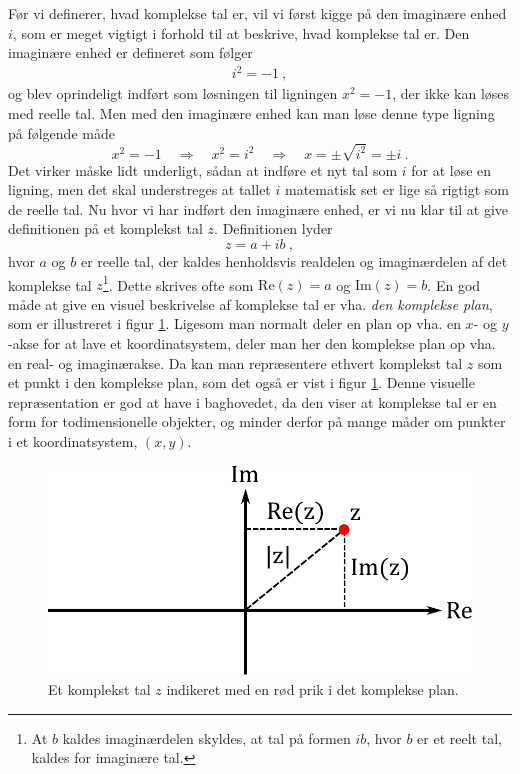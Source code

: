Før vi definerer, hvad komplekse tal er, vil vi først kigge på den imaginære enhed $i$, som er meget vigtigt i forhold til at beskrive, hvad komplekse tal er. Den imaginære enhed er defineret som følger
\begin{eqnarray}
i^2 = -1 \ ,
\end{eqnarray}
og blev oprindeligt indført som løsningen til ligningen $x^2 = -1$, der ikke kan løses med reelle tal. Men med den imaginære enhed kan man løse denne type ligning på følgende måde
$$x^2 = -1 \quad \Rightarrow \quad x^2 = i^2 \quad \Rightarrow \quad x = \pm \sqrt{i^2} = \pm i \ .$$
Det virker måske lidt underligt, sådan at indføre et nyt tal som $i$ for at løse en ligning, men det skal understreges at tallet $i$ matematisk set er lige så rigtigt som de reelle tal. Nu hvor vi har indført den imaginære enhed, er vi nu klar til at give definitionen på et komplekst tal $z$. Definitionen lyder 
\begin{equation}
z = a+ib \ ,
\label{kompleks_def}
\end{equation}  
hvor $a$ og $b$ er reelle tal, der kaldes henholdsvis realdelen og imaginærdelen af det komplekse tal $z$\footnote{At $b$ kaldes imaginærdelen skyldes, at tal på formen $ib$, hvor $b$ er et reelt tal, kaldes for imaginære tal.}.  Dette skrives ofte som $\text{Re}(z) = a$ og $\text{Im}(z) = b$. En god måde at give en visuel beskrivelse af komplekse tal er vha. \emph{den komplekse plan}, som er illustreret i figur \ref{complex_plane}. Ligesom man normalt deler en plan op vha. en  $x$- og $y$-akse for at lave et koordinatsystem, deler man her den komplekse plan op vha. en real- og imaginærakse. Da kan man repræsentere ethvert komplekst tal $z$ som et punkt i den komplekse plan, som det også er vist i figur \ref{complex_plane}. Denne visuelle repræsentation er god at have i baghovedet, da den viser at komplekse tal er en form for todimensionelle objekter, og minder derfor på mange måder om punkter i et koordinatsystem, $(x,y)$.
\begin{figure}[h!]
	\centering
	\includegraphics[scale=0.9]{matematik/fig/complex_plane.pdf}
	\caption{Et komplekst tal $z$ indikeret med en rød prik i det komplekse plan.}
	\label{complex_plane}
\end{figure} 

